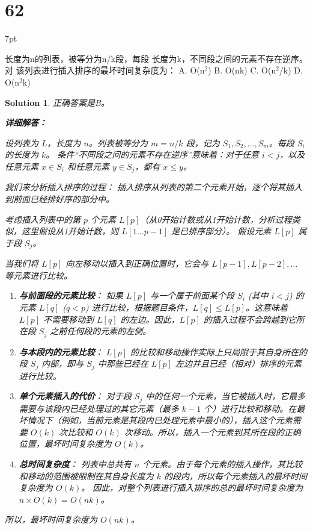 \documentclass[UTF8]{report}
\newtheorem{solution}{Solution}
\theoremstyle{MyLineTheoremStyle} %
\theoremstyle{MyBlockTheoremStyle} %
\theoremstyle{MySubsubsectionStyle} %
\newenvironment{graybox}{%
        \def\FrameCommand{%
        \hspace{1pt}%
        {\color{gray}\small \vrule width 2pt}%
        {\color{graybox_color}\vrule width 4pt}%
        \colorbox{graybox_color}%
        }%
        \MakeFramed{\advance\hsize-\width\FrameRestore}%
        \noindent\hspace{-4.55pt}%
        \begin{adjustwidth}{}{7pt}%
        \vspace{2pt}\vspace{2pt}%
        }
        {%
        \vspace{2pt}\end{adjustwidth}\endMakeFramed%
        }
\begin{document}
\section*{62}
\begin{graybox}
长度为n的列表，被等分为n/k段，每段
长度为k，不同段之间的元素不存在逆序。对
该列表进行插入排序的最坏时间复杂度为：
A. O(n$^2$)
B. O(nk)
C. O(n$^2$/k)
D. O(n$^2$k)
\end{graybox}

\begin{solution}
正确答案是B。

\textbf{详细解答：}

设列表为 $L$，长度为 $n$。列表被等分为 $m = n/k$ 段，记为 $S_1, S_2, \ldots, S_m$。每段 $S_i$ 的长度为 $k$。
条件“不同段之间的元素不存在逆序”意味着：对于任意 $i < j$，以及任意元素 $x \in S_i$ 和任意元素 $y \in S_j$，都有 $x \le y$。

我们来分析插入排序的过程：
插入排序从列表的第二个元素开始，逐个将其插入到前面已经排好序的部分中。

考虑插入列表中的第 $p$ 个元素 $L[p]$（从0开始计数或从1开始计数，分析过程类似，这里假设从1开始计数，则 $L[1 \ldots p-1]$ 是已排序部分）。
假设元素 $L[p]$ 属于段 $S_j$。

当我们将 $L[p]$ 向左移动以插入到正确位置时，它会与 $L[p-1], L[p-2], \ldots$ 等元素进行比较。
\begin{enumerate}
    \item \textbf{与前面段的元素比较}：
    如果 $L[p]$ 与一个属于前面某个段 $S_i$ (其中 $i < j$) 的元素 $L[q]$ ($q < p$) 进行比较，根据题目条件，$L[q] \le L[p]$。这意味着 $L[p]$ 不需要移动到 $L[q]$ 的左边。因此，$L[p]$ 的插入过程不会跨越到它所在段 $S_j$ 之前任何段的元素的左侧。

    \item \textbf{与本段内的元素比较}：
    $L[p]$ 的比较和移动操作实际上只局限于其自身所在的段 $S_j$ 内部，即与 $S_j$ 中那些已经在 $L[p]$ 左边并且已经（相对）排序的元素进行比较。

    \item \textbf{单个元素插入的代价}：
    对于段 $S_j$ 中的任何一个元素，当它被插入时，它最多需要与该段内已经处理过的其它元素（最多 $k-1$ 个）进行比较和移动。在最坏情况下（例如，当前元素是其段内已处理元素中最小的），插入这个元素需要 $O(k)$ 次比较和 $O(k)$ 次移动。所以，插入一个元素到其所在段的正确位置，最坏时间复杂度为 $O(k)$。

    \item \textbf{总时间复杂度}：
    列表中总共有 $n$ 个元素。由于每个元素的插入操作，其比较和移动的范围被限制在其自身长度为 $k$ 的段内，所以每个元素插入的最坏时间复杂度为 $O(k)$。
    因此，对整个列表进行插入排序的总的最坏时间复杂度为 $n \times O(k) = O(nk)$。
\end{enumerate}

所以，最坏时间复杂度为 $O(nk)$。

\end{solution}
\end{document}
